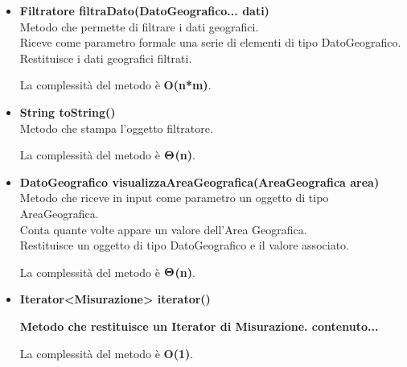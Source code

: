 \documentclass[a4paper, 12pt]{scrreprt}
\begin{document}
\begin{itemize}
				La complessit\`a del metodo è \textbf{O(n*m)}.
				
				\item \textbf {Filtratore filtraDato(DatoGeografico... dati)}
				\\Metodo che permette di filtrare i dati geografici.
				\\Riceve come parametro formale una serie di elementi di tipo DatoGeografico.
				\\Restituisce i dati geografici filtrati.
				
				La complessit\`a del metodo è \textbf{O(n*m)}.
				
				\item \textbf {String toString()}
				\\Metodo che stampa l'oggetto filtratore.
				
				La complessit\`a del metodo \`e $\mathbf{\Theta}$\textbf{(n)}.
				
				\item \textbf{DatoGeografico visualizzaAreaGeografica(AreaGeografica area)}
				\\Metodo che riceve in input come parametro un oggetto di tipo AreaGeografica.
				\\Conta quante volte appare un valore dell'Area Geografica.
				\\Restituisce un oggetto di tipo DatoGeografico e il valore associato.
				
				La complessit\`a del metodo \`e $\mathbf{\Theta}$\textbf{(n)}.
				
				\item \textbf{Iterator<Misurazione> iterator()}
				
								
				\textbf{Metodo che restituisce un Iterator di Misurazione.	contenuto...}
				
				La complessit\`a del metodo è \textbf{O(1)}.
				
			\end{itemize}
\end{document}
